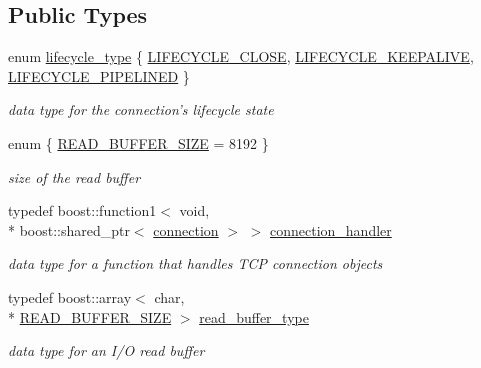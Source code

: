 \subsection*{Public Types}
\begin{DoxyCompactItemize}
\item 
enum \hyperlink{classpion_1_1tcp_1_1connection_a1888aaf31f431a3f00c70c2568f4cb25}{lifecycle\-\_\-type} \{ \hyperlink{classpion_1_1tcp_1_1connection_a1888aaf31f431a3f00c70c2568f4cb25a1eee3589ec1f6b59a13bc36fd5f48e63}{L\-I\-F\-E\-C\-Y\-C\-L\-E\-\_\-\-C\-L\-O\-S\-E}, 
\hyperlink{classpion_1_1tcp_1_1connection_a1888aaf31f431a3f00c70c2568f4cb25ab3bb67380ff48e263e16b55ff786e96f}{L\-I\-F\-E\-C\-Y\-C\-L\-E\-\_\-\-K\-E\-E\-P\-A\-L\-I\-V\-E}, 
\hyperlink{classpion_1_1tcp_1_1connection_a1888aaf31f431a3f00c70c2568f4cb25ac3e9ae9a9b7a71232679416d57b7d95f}{L\-I\-F\-E\-C\-Y\-C\-L\-E\-\_\-\-P\-I\-P\-E\-L\-I\-N\-E\-D}
 \}
\begin{DoxyCompactList}\small\item\em data type for the connection's lifecycle state \end{DoxyCompactList}\item 
enum \{ \hyperlink{classpion_1_1tcp_1_1connection_ad123ec22701e50c2c39d4a6cdbea3e92aac7c4dbea8f7fc8b471d7fcabf619221}{R\-E\-A\-D\-\_\-\-B\-U\-F\-F\-E\-R\-\_\-\-S\-I\-Z\-E} = 8192
 \}
\begin{DoxyCompactList}\small\item\em size of the read buffer \end{DoxyCompactList}\item 
typedef boost\-::function1$<$ void, \\*
boost\-::shared\-\_\-ptr$<$ \hyperlink{classpion_1_1tcp_1_1connection}{connection} $>$ $>$ \hyperlink{classpion_1_1tcp_1_1connection_aa2b220bff63f258b6aeba7eaf9a39aed}{connection\-\_\-handler}
\begin{DoxyCompactList}\small\item\em data type for a function that handles T\-C\-P connection objects \end{DoxyCompactList}\item 
typedef boost\-::array$<$ char, \\*
\hyperlink{classpion_1_1tcp_1_1connection_ad123ec22701e50c2c39d4a6cdbea3e92aac7c4dbea8f7fc8b471d7fcabf619221}{R\-E\-A\-D\-\_\-\-B\-U\-F\-F\-E\-R\-\_\-\-S\-I\-Z\-E} $>$ \hyperlink{classpion_1_1tcp_1_1connection_abd482572a19c1aecadaccd360837f7c2}{read\-\_\-buffer\-\_\-type}
\begin{DoxyCompactList}\small\item\em data type for an I/\-O read buffer \end{DoxyCompactList}\item 

\end{DoxyCompactItemize}
